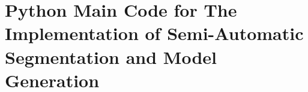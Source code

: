 \section{Python Main Code for The Implementation of Semi-Automatic Segmentation and Model Generation}
\label{sec:appendixPythonMain}

